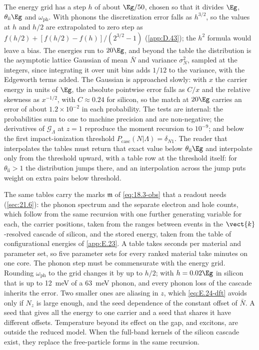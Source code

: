 The energy grid has a step $h$ of about $\Eg/50$, chosen so that it divides $\Eg$, $\theta_{\mathrm{ii}}\Eg$ and $\omega_{\mathrm{ph}}$. With phonons the discretization error falls as $h^{3/2}$, so the values at $h$ and $h/2$ are extrapolated to zero step as $f(h/2) + [f(h/2) - f(h)]/(2^{3/2} - 1)$ (\cref{app:D.43}); the $h^2$ formula would leave a bias. The energies run to $20\Eg$, and beyond the table the distribution is the asymptotic lattice Gaussian of mean $\bar N$ and variance $\sigma_N^2$, sampled at the integers, since integrating it over unit bins adds $1/12$ to the variance, with the Edgeworth terms added. The Gaussian is approached slowly: with $x$ the carrier energy in units of $\Eg$, the absolute pointwise error falls as $C/x$ and the relative skewness as $x^{-1/2}$, with $C \approx 0.24$ for silicon, so the match at $20\Eg$ carries an error of about $1.2\times10^{-2}$ in each probability. The tests are internal: the probabilities sum to one to machine precision and are non-negative; the derivatives of $\mathcal{G}_\Lambda$ at $z = 1$ reproduce the moment recursion to $10^{-9}$; and below the first impact-ionization threshold $P_{\mathrm{casc}}(N|\Lambda) = \delta_{N1}$. The reader that interpolates the tables must return that exact value below $\theta_{\mathrm{ii}}\Eg$ and interpolate only from the threshold upward, with a table row at the threshold itself: for $\theta_{\mathrm{ii}} > 1$ the distribution jumps there, and an interpolation across the jump puts weight on extra pairs below threshold.

The same tables carry the marks $\mathfrak{m}$ of \cref{eq:18.3-obs} that a readout needs (\cref{sec:21.6}): the phonon spectrum and the separate electron and hole counts, which follow from the same recursion with one further generating variable for each, the carrier positions, taken from the ranges between events in the $\vect{k}$-resolved cascade of silicon, and the stored energy, taken from the table of configurational energies of \cref{app:E.23}. A table takes seconds per material and parameter set, so five parameter sets for every ranked material take minutes on one core. The phonon step must be commensurate with the energy grid. Rounding $\omega_{\mathrm{ph}}$ to the grid changes it by up to $h/2$; with $h = 0.02\Eg$ in silicon that is up to \SI{12}{meV} of a \SI{63}{meV} phonon, and every phonon loss of the cascade inherits the error. Two smaller ones are aliasing in $z$, which \cref{eq:E.24-dft} avoids only if $N_z$ is large enough, and the seed dependence of the constant offset of $\bar N$. A seed that gives all the energy to one carrier and a seed that shares it have different offsets. Temperature beyond its effect on the gap, and excitons, are outside the reduced model. When the full-band kernels of the silicon cascade exist, they replace the free-particle forms in the same recursion.

